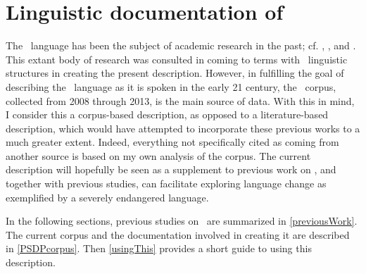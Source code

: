 \FB

\section{Linguistic documentation of \PS}\label{lingDoc}
The \PS\ language has been the subject of academic research in the past; cf. \citet{Halasz1896}, \citet{Lagercrantz1926}, \citet{Ruong1943} and \citet{Lehtiranta1992}. %
This extant body of research was consulted in coming to terms with \PS\ linguistic structures in creating the present description. 
However, in fulfilling the goal of describing the \PS\ language as it is spoken in the early 21 century, the \PSDP\ corpus, collected from 2008 through 2013, is the main source of data. With this in mind, I consider this a corpus-based description, as opposed to a literature-based description, which would have attempted to incorporate these previous works to a much greater extent. Indeed, everything not specifically cited as coming from another source is based on my own analysis of the corpus. 
The current description will hopefully be seen as a supplement to previous work on \PS, and together with previous studies, can facilitate exploring language change as exemplified by a severely endangered language. 

In the following sections, previous studies on \PS\ are summarized in \SEC\ref{previousWork}. The current corpus and the documentation involved in creating it are described in \SEC\ref{PSDPcorpus}. Then \SEC\ref{usingThis} provides a short guide to using this description. 


